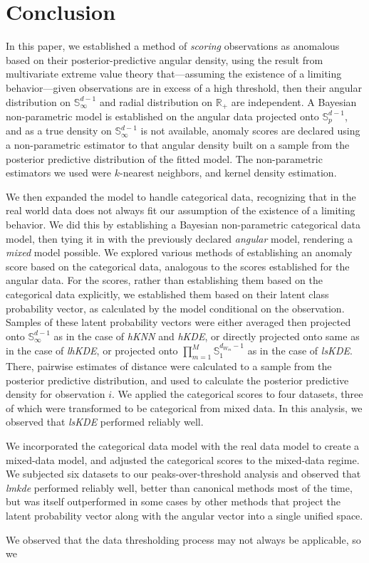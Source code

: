 \section{Conclusion}
In this paper, we established a method of \emph{scoring} observations as anomalous based
    on their posterior-predictive angular density, using the result from multivariate extreme value
    theory that---assuming the existence of a limiting behavior---given observations are in excess of 
    a high threshold, then their angular distribution on $\mathbb{S}_{\infty}^{d-1}$ and 
    radial distribution on $\mathbb{R}_+$ are independent. A Bayesian non-parametric model 
    is established on the angular data projected onto $\mathbb{S}_p^{d-1}$, and as a 
    true density on $\mathbb{S}_{\infty}^{d-1}$ is not available, 
    anomaly scores are declared using a non-parametric estimator to that angular density 
    built on a sample from the posterior predictive distribution of the fitted model.  The
    non-parametric estimators we used were $k$-nearest neighbors, and kernel density estimation.

We then expanded the model to handle categorical data, recognizing that in the real world data
    does not always fit our assumption of the existence of a limiting behavior.  We did this
    by establishing a Bayesian non-parametric categorical data model, then tying it in with the
    previously declared \emph{angular} model, rendering a \emph{mixed} model possible.  
    We explored various methods of establishing an anomaly score based on the categorical data,
    analogous to the scores established for the angular data.
    For the scores, rather than establishing them based on the categorical data explicitly, we
    established them based on their latent class probability vector, as calculated by the model
    conditional on the observation. Samples of these latent probability vectors were either 
    averaged then projected onto $\mathbb{S}_{\infty}^{d-1}$ as in the case of \emph{hKNN} and 
    \emph{hKDE}, or directly projected onto same as in the case of \emph{lhKDE}, or projected onto
    $\prod_{m = 1}^M\mathbb{S}_1^{d_{W_m}-1}$ as in the case of \emph{lsKDE}.  There, pairwise 
    estimates of distance were calculated to a sample from the posterior predictive distribution, 
    and used to calculate the posterior predictive density for observation $i$. We applied the 
    categorical scores to four datasets, three of which were transformed to be categorical
    from mixed data.  In this analysis, we observed that \emph{lsKDE} performed reliably well.

We incorporated the categorical data model with the real data model to create a mixed-data model, 
    and adjusted the categorical scores to the mixed-data regime.  We subjected six datasets
    to our peaks-over-threshold analysis and observed that \emph{lmkde} performed reliably well,
    better than canonical methods most of the time, but was itself outperformed in some cases
    by other methods that project the latent probability vector along with the angular vector 
    into a single unified space.

We observed that the data thresholding process may not always be applicable, so we 
    
